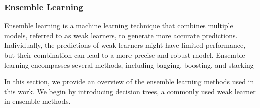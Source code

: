 \subsubsection{Ensemble Learning}
Ensemble learning is a machine learning technique that combines multiple models, referred to as weak learners, to generate more accurate predictions.
Individually, the predictions of weak learners might have limited performance, but their combination can lead to a more precise and robust model.
Ensemble learning encompasses several methods, including bagging, boosting, and stacking\cite{James2023AnIS, pavlyshenko2018stacking}

In this section, we provide an overview of the ensemble learning methods used in this work.
We begin by introducing decision trees, a commonly used weak learner in ensemble methods.
